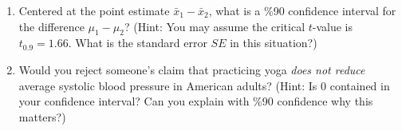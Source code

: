 \documentclass{ccg-topic}
\begin{document}
\begin{enumerate}
\item Centered at the point estimate $\bar{x}_1 - \bar{x}_2$, what is a \%90 confidence interval for the difference $\mu_1 - \mu_2$? (Hint: You may assume the critical $t$-value is $t_{0.9}=1.66$. What is the standard error $SE$ in this situation?)
         
\vfill
 
\item Would you reject someone's claim that practicing yoga \emph{does not reduce} average systolic blood pressure in American adults? (Hint: Is $0$ contained in your confidence interval? Can you explain with \%90 confidence why this matters?)
\vfill

\end{enumerate}
\end{document}

